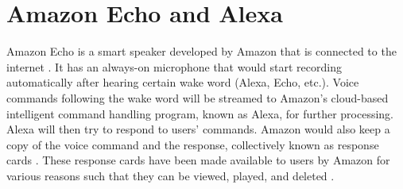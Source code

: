 \section{Amazon Echo and Alexa}
Amazon Echo is a smart speaker developed by Amazon that is connected to the internet \cite{wikipedia_2019}. It has an always-on microphone that would start recording automatically after hearing certain wake word (Alexa, Echo, etc.). Voice commands following the wake word will be streamed to Amazon's cloud-based intelligent command handling program, known as Alexa, for further processing. Alexa will then try to respond to users' commands. Amazon would also keep a copy of the voice command and the response, collectively known as response cards \cite{ford2019alexa}. These response cards have been made available to users by Amazon for various reasons such that they can be viewed, played, and deleted \cite{amazon_2010}. 
